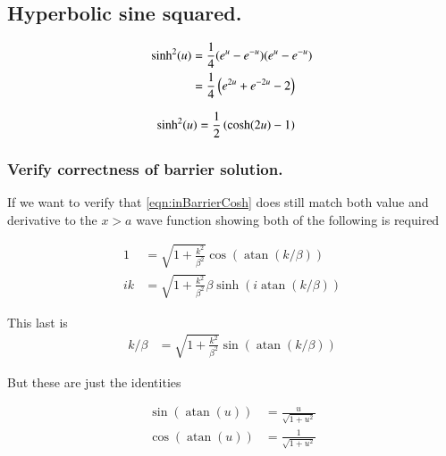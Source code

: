 \documentclass{article}
\DeclareMathOperator{\atan}{atan}
\begin{document}
\subsection{ Hyperbolic sine squared. }

\begin{align*}
\sinh^2(u) 
&=
\frac{1}{4} (e^u - e^{-u}) (e^u - e^{-u}) \\
&=
\frac{1}{4} \left(e^{2u} + e^{-2u} -2 \right) \\
\end{align*}

\begin{align}\label{eqn:sinhSquared}
\sinh^2(u) 
&=
\frac{1}{2} \left( \cosh(2u) -1 \right) 
\end{align}

\subsubsection{ Verify correctness of barrier solution. }

If we want to verify that \ref{eqn:inBarrierCosh} 
does still match both value and derivative to the $x>a$ wave function
showing both of the following is required

\begin{align*}
1 &= \sqrt{1 + \frac{k^2}{\beta^2}} \cos\left( \atan(k/\beta) \right) \\
ik &=
\sqrt{1 + \frac{k^2}{\beta^2}} \beta \sinh\left( i \atan(k/\beta) \right)
\end{align*}

This last is
\begin{align*}
k/\beta &=
\sqrt{1 + \frac{k^2}{\beta^2}} \sin\left( \atan(k/\beta) \right)
\end{align*}

But these are just the identities

\begin{align*}
\sin\left( \atan(u) \right) &= \frac{u}{\sqrt{1 + u^2}} \\
\cos\left( \atan(u) \right) &= \frac{1}{\sqrt{1 + u^2}}
\end{align*}



\end{document}
